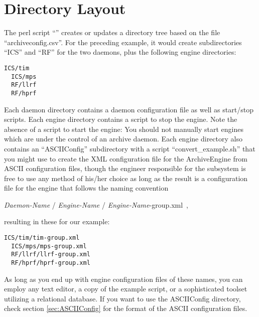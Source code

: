\section{Directory Layout}
The perl script ``'' creates or updates a
directory tree based on the file ``archiveconfig.csv''. For the preceding
example, it would create subdirectories ``ICS'' and ``RF'' for the two
daemons, plus the following engine directories:
\begin{lstlisting}[frame=none,keywordstyle=\sffamily]
  ICS/tim
  ICS/mps
  RF/llrf
  RF/hprf
\end{lstlisting}
\noindent Each daemon directory contains a daemon configuration file
as well as start/stop scripts. Each engine directory contains a script
to stop the engine. Note the absence of a script to start the engine:
You should not manually start engines which are under the control of
an archive daemon.  Each engine directory also contains an
``ASCIIConfig'' subdirectory with a script ``convert\_example.sh''
that you might use to create the XML configuration file for the
ArchiveEngine from ASCII configuration files, though the engineer
responsible for the subsystem is free to use any method of his/her
choice as long as the result is a configuration file for the engine
that follows the naming convention
\begin{center}
{\it Daemon-Name} / {\it Engine-Name} / {\it Engine-Name}-group.xml~,\\
\end{center}
resulting in these for our example:
\begin{lstlisting}[frame=none,keywordstyle=\sffamily]
  ICS/tim/tim-group.xml
  ICS/mps/mps-group.xml
  RF/llrf/llrf-group.xml
  RF/hprf/hprf-group.xml
\end{lstlisting}
As long as you end up with engine configuration files of these names,
you can employ any text editor, a copy of the example script, or a
sophisticated toolset utilizing a relational database.
If you want to use the ASCIIConfig directory, check section
\ref{sec:ASCIIConfig} for the format of the ASCII configuration files.

